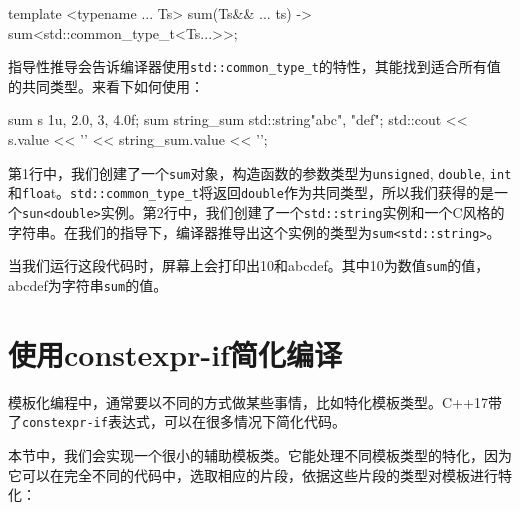 \begin{codebox}[cpp]
template <typename ... Ts>
sum(Ts&& ... ts) -> sum<std::common_type_t<Ts...>>;
\end{codebox}

指导性推导会告诉编译器使用\texttt{std::common\_type\_t}的特性，其能找到适合所有值的共同类型。来看下如何使用：

\begin{codebox}[cpp]
sum s {1u, 2.0, 3, 4.0f};
sum string_sum {std::string{"abc"}, "def"};
std::cout << s.value << '\n'
          << string_sum.value << '\n';
\end{codebox}

第1行中，我们创建了一个\texttt{sum}对象，构造函数的参数类型为\texttt{unsigned}, \texttt{double}, \texttt{int}和\texttt{floa}t。\texttt{std::common\_type\_t}将返回\texttt{double}作为共同类型，所以我们获得的是一个\texttt{sun<double>}实例。第2行中，我们创建了一个\texttt{std::string}实例和一个C风格的字符串。在我们的指导下，编译器推导出这个实例的类型为\texttt{sum<std::string>}。

当我们运行这段代码时，屏幕上会打印出10和abcdef。其中10为数值\texttt{sum}的值，abcdef为字符串\texttt{sum}的值。


\section{使用constexpr-if简化编译}

模板化编程中，通常要以不同的方式做某些事情，比如特化模板类型。C++17带了\texttt{constexpr-if}表达式，可以在很多情况下简化代码。


本节中，我们会实现一个很小的辅助模板类。它能处理不同模板类型的特化，因为它可以在完全不同的代码中，选取相应的片段，依据这些片段的类型对模板进行特化：

